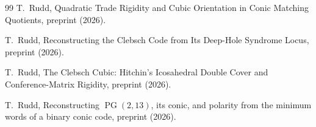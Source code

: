 \documentclass[11pt]{article}
\theoremstyle{definition}
\theoremstyle{remark}
\begin{document}
\begin{thebibliography}{99}
T.~Rudd,
\newblock Quadratic Trade Rigidity and Cubic Orientation in Conic Matching
Quotients,
\newblock preprint (2026).

T.~Rudd,
\newblock Reconstructing the Clebsch Code from Its Deep-Hole Syndrome Locus,
\newblock preprint (2026).

T.~Rudd,
\newblock The Clebsch Cubic: Hitchin's Icosahedral Double Cover and
  Conference-Matrix Rigidity,
\newblock preprint (2026).

T.~Rudd,
\newblock Reconstructing \(\operatorname{PG}(2,13)\), its conic, and polarity
from the minimum words of a binary conic code,
\newblock preprint (2026).

\end{thebibliography}
\end{document}
